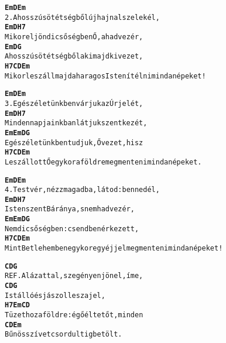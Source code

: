 \cleardoublepage
{}
\kottastart
{}
\kottaend
\begin{minipage}{\textwidth}
\begin{alltt}
\textbf{      Em                    D            Em}
2. A hosszú sötétségből új hajnal szele kél,
\textbf{         Em                D          H7}
   Mikor eljön dicsőségben Ő, a hadvezér,
\textbf{      Em                D             G}
   A hosszú sötétségből aki majd kivezet,
\textbf{          H7             C            D                  Em}
   Mikor leszáll majd a haragos Isten ítélni mind a népeket!
\end{alltt}
\vspace{0.0cm}
\versszakspacing
\end{minipage}
\begin{minipage}{\textwidth}
\begin{alltt}
\textbf{   Em                D              Em}
3. Egész életünkben várjuk az Úr jelét,
\textbf{    Em                D              H7}
   Mindennapjainkban látjuk szent kezét,
\textbf{   Em        Em      D           G}
   Egész életünkben tudjuk, Ő vezet, hisz
\textbf{    H7          C                D                     Em}
   Leszállott Ő egykor a földre megmenteni mind a népeket.
\end{alltt}
\vspace{0.0cm}
\versszakspacing
\end{minipage}
\begin{minipage}{\textwidth}
\begin{alltt}
\textbf{    Em                     D            Em}
4. Testvér, nézz magadba, látod: benned él,
\textbf{   Em                      D        H7}
   Isten szent Báránya, s nem hadvezér,
\textbf{   Em        Em       D           G}
   Nem dicsőségben: csendben érkezett,
\textbf{         H7         C                 D                     Em}
   Mint Betlehemben egykor egy éjjel megmenteni mind a népeket!
\end{alltt}
\vspace{0.0cm}
\versszakspacing
\end{minipage}
\begin{minipage}{\textwidth}
\begin{alltt}
\textbf{     C            D           G}
REF. Alázattal, szegényen jön el, íme,
\textbf{     C           D             G}
     Istálló és jászol lesz a jel,
\textbf{      H7          Em     C        D}
     Tüzet hoz a földre: égő éltetőt, minden
\textbf{      C             D           Em}
     Bűnös szívet csordultig betölt.
\end{alltt}
\vspace{0.0cm}
\versszakspacing
\end{minipage}
~\vspace{1.0cm}
\newline
